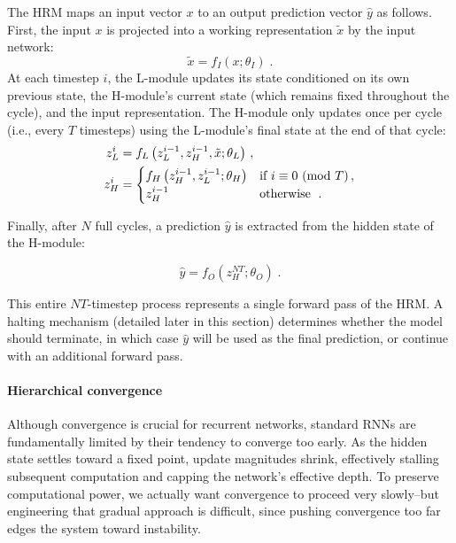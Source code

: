 The HRM maps an input vector $x$ to an output prediction vector $\hat{y}$ as follows. First, the input $x$ is projected into a working representation $\tilde{x}$ by the input network:
\begin{equation*}
    \tilde{x} = f_I(x; \theta_I) \;.
\end{equation*}
At each timestep $i$, the L-module updates its state conditioned on its own previous state, the H-module’s current state (which remains fixed throughout the cycle), and the input representation. The H-module only updates once per cycle (i.e., every $T$ timesteps) using the L-module’s final state at the end of that cycle:
\begin{align*}
    z_L^i &= f_L\left( z_L^{i-1}, z_H^{i-1}, \tilde{x}; \theta_L \right)\,, \\
    z_H^i &= \begin{cases}
f_H\left( z_H^{i-1}, z_L^{i-1}; \theta_H \right) & \text{if } i \equiv 0\ (\mathrm{mod}\ T)\,, \\
z_H^{i-1} & \text{otherwise }\;.
\end{cases}
\end{align*}

Finally, after $N$ full cycles, a prediction $\hat{y}$ is extracted from the hidden state of the H-module:

\begin{equation*}
    \hat{y} = f_O(z_H^{N T}; \theta_O) \;.
\end{equation*}

This entire $NT$-timestep process represents a single forward pass of the HRM. A halting mechanism (detailed later in this section) determines whether the model should terminate, in which case $\hat{y}$ will be used as the final prediction, or continue with an additional forward pass. 

\paragraph{Hierarchical convergence}


Although convergence is crucial for recurrent networks, standard RNNs are fundamentally limited by their tendency to converge too early. As the hidden state settles toward a fixed point, update magnitudes shrink, effectively stalling subsequent computation and capping the network’s effective depth. To preserve computational power, we actually want convergence to proceed very slowly--but engineering that gradual approach is difficult, since pushing convergence too far edges the system toward instability.

